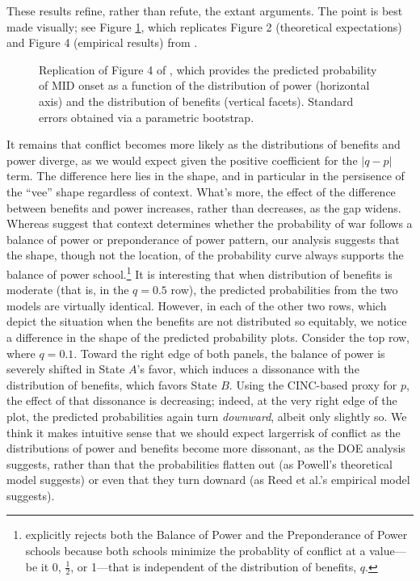 These results refine, rather than refute, the extant arguments.
The point is best made visually; see Figure \ref{fig:rcnw}, which replicates Figure 2 (theoretical expectations) and Figure 4 (empirical results) from \citet[1207 and 1213, respectively]{reed2008war}.
\begin{figure}[!ht]
\centering

\caption{%
  Replication of Figure 4 of \citet[1213]{reed2008war}, which provides the predicted probability of MID onset as a function of the distribution of power (horizontal axis) and the distribution of benefits (vertical facets).
  Standard errors obtained via a parametric bootstrap.
}
\label{fig:rcnw}
\end{figure}
It remains that conflict becomes more likely as the distributions of benefits and power diverge, as we would expect given the positive coefficient for the $|q - p|$ term.
The difference here lies in the shape, and in particular in the persisence of the ``vee'' shape regardless of context.
What's more, the effect of the difference between benefits and power increases, rather than decreases, as the gap widens.
Whereas \citet[1206--1207]{reed2008war} suggest that context determines whether the probability of war follows a balance of power or preponderance of power pattern, our analysis suggests that the shape, though not the location, of the probability curve always supports the balance of power school.\footnote{%
  \citet[104--110]{powell1999} explicitly rejects both the Balance of Power and the Preponderance of Power schools because both schools minimize the probablity of conflict at a value---be it 0, $\frac{1}{2}$, or 1---that is independent of the distribution of benefits, $q$.  
}
It is interesting that when distribution of benefits is moderate (that is, in the $q = 0.5$ row), the predicted probabilities from the two models are virtually identical.
However, in each of the other two rows, which depict the situation when the benefits are not distributed so equitably, we notice a difference in the shape of the predicted probability plots.
Consider the top row, where $q = 0.1$. 
Toward the right edge of both panels, the balance of power is severely shifted in State $A$'s favor, which induces a dissonance with the distribution of benefits, which favors State $B$.  
Using the CINC-based proxy for $p$, the effect of that dissonance is decreasing; indeed, at the very right edge of the plot, the predicted probabilities again turn \emph{downward}, albeit only slightly so.
We think it makes intuitive sense that we should expect largerrisk of conflict as the distributions of power and benefits become more dissonant, as the DOE analysis suggests, rather than that the probabilities flatten out (as Powell's theoretical model suggests) or even that they turn downard (as Reed et al.'s empirical model suggests).



